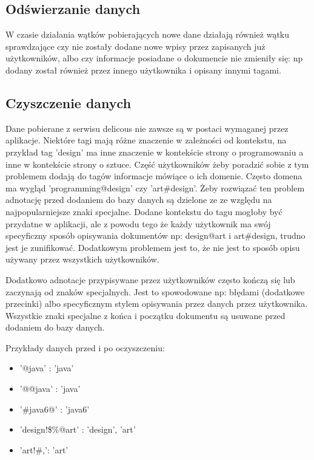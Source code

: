\subsection*{Odświerzanie danych}

W czasie działania wątków pobierających nowe dane działają również wątku sprawdzające czy nie zostały dodane nowe wpisy przez zapisanych już użytkowników, albo czy informacje posiadane o dokumencie nie zmieniły się: np dodany został również przez innego użytkownika i opisany innymi tagami.

\subsection*{Czyszczenie danych}

Dane pobierane z serwisu delicous nie zawsze są w postaci wymaganej przez aplikacje. Niektóre tagi mają różne znaczenie w zależności od kontekstu, na przykład tag 'design' ma inne znaczenie w kontekście strony o programowaniu a inne w kontekście strony o sztuce. Część użytkowników żeby poradzić sobie  z tym problemem dodają do tagów informacje mówiące o ich domenie. Często domena ma wygląd 'programming@design' czy 'art\#design'. Żeby rozwiązać ten problem adnotację przed dodaniem do bazy danych są dzielone ze ze względu na najpopularniejsze znaki specjalne. Dodane kontekstu do tagu mogłoby być przydatne w aplikacji, ale z powodu tego że każdy użytkownik ma swój specyficzny sposób opisywania dokumentów np: design@art i art\#design, trudno jest je zunifikować. Dodatkowym problemem jest to, że nie jest to sposób opisu używany przez wszystkich użytkowników. 


Dodatkowo adnotacje przypisywane przez użytkowników często kończą się lub zaczynają od znaków specjalnych. Jest to spowodowane np: błędami (dodatkowe przecinki) albo specyficznym stylem opisywania przez danych przez użytkownika. Wszystkie znaki specjalne z końca i początku dokumentu są usuwane przed dodaniem do bazy danych.

Przykłady danych przed i po oczyszczeniu:

\begin{itemize} 
    \item '@java' : 'java'
    \item '@@java' : 'java'
    \item  '\#java6@' : 'java6'
    \item  'design!\$\%@art' : 'design', 'art'
    \item  'art!\#,': 'art'
\end{itemize}

